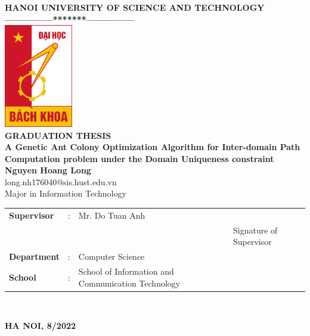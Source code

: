 \thispagestyle{empty}
%
\begin{center}

{
{\fontsize{14}{12}\selectfont \textbf{HANOI UNIVERSITY OF SCIENCE AND TECHNOLOGY}}\\
\textbf{---------------*******---------------}\\[1cm]
\includegraphics[width=3cm]{Figures/bklogo.jpg}
\centering
\\[1cm]
{\fontsize{25}{43}\selectfont \textbf{GRADUATION THESIS}}\\[0.3cm]
{\fontsize{21.3}{30}\selectfont \textbf{A Genetic Ant Colony Optimization Algorithm for Inter-domain Path Computation problem under the Domain Uniqueness constraint}}\\[0.3cm]
{\fontsize{14}{20}\selectfont \textbf{Nguyen Hoang Long} \\
\fontsize{13}{18}\selectfont long.nh176040@sis.hust.edu.vn}\\[0.3cm]

{\fontsize{17}{10}\selectfont Major in Information Technology}\\[1.5cm]

\vspace*{1\baselineskip}  
\begin{tabular}{l c l l}
  \textbf{Supervisor} & : &  Mr. Do Tuan Anh & \text{\_\_\_\_\_\_\_\_\_\_\_\_\_\_\_\_\_\_\_\_} \\
  & & & \fontsize{10}{10}\selectfont Signature of Supervisor\\
  \textbf{Department} & : &  Computer Science \\
  \textbf{School} & : &  School of Information and Communication Technology \\
\end{tabular} \\[3cm]
}

\vspace*{1\baselineskip}  
\fontsize{15}{19}\selectfont \textbf{HA NOI, 8/2022}
\end{center}
\pagebreak